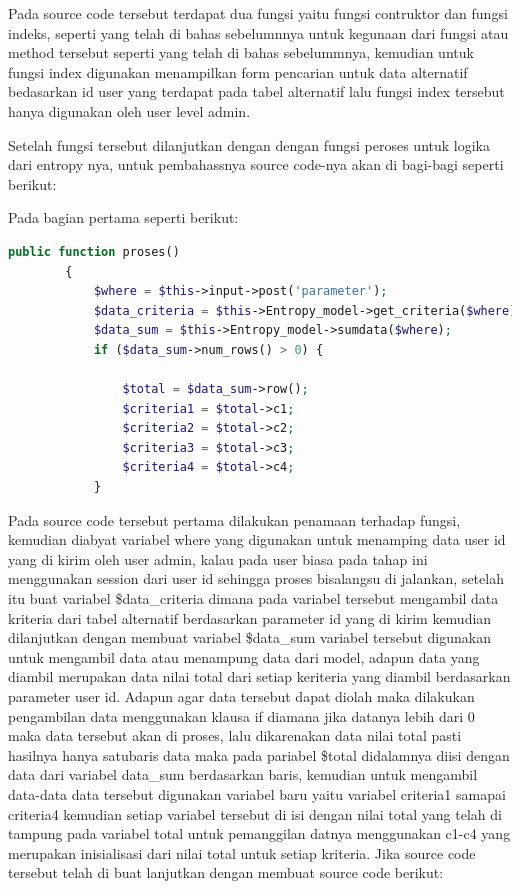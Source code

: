 Pada source code tersebut terdapat dua fungsi yaitu fungsi contruktor dan fungsi indeks, seperti yang telah di bahas sebelumnnya untuk kegunaan dari fungsi atau method tersebut seperti yang telah di bahas sebelummnya, kemudian untuk fungsi index digunakan menampilkan form pencarian untuk data alternatif bedasarkan id user yang terdapat pada tabel alternatif lalu fungsi index tersebut hanya digunakan oleh user level admin.\par
	Setelah fungsi tersebut dilanjutkan dengan dengan fungsi peroses untuk logika dari entropy nya, untuk pembahassnya source code-nya akan di bagi-bagi seperti berikut:\par
Pada bagian pertama seperti berikut:\par

\begin{lstlisting}[language=PHP]
	    public function proses()  
	    {  
	        $where = $this->input->post('parameter');  
	        $data_criteria = $this->Entropy_model->get_criteria($where);  
	        $data_sum = $this->Entropy_model->sumdata($where);  
	        if ($data_sum->num_rows() > 0) {  
	  
	            $total = $data_sum->row();  
	            $criteria1 = $total->c1;  
	            $criteria2 = $total->c2;  
	            $criteria3 = $total->c3;  
	            $criteria4 = $total->c4;  
	        } 
\end{lstlisting}

Pada source code tersebut pertama dilakukan penamaan terhadap fungsi, kemudian diabyat variabel where yang digunakan untuk menamping data user id yang di kirim oleh user admin, kalau pada user biasa pada tahap ini menggunakan session dari user id sehingga proses bisalangsu di jalankan, setelah itu buat variabel \$data\_criteria dimana pada variabel tersebut mengambil data kriteria dari tabel alternatif berdasarkan parameter id yang di kirim kemudian dilanjutkan dengan membuat variabel \$data\_sum variabel tersebut digunakan untuk mengambil data atau menampung data dari model, adapun data yang diambil merupakan data nilai total dari setiap keriteria yang diambil berdasarkan parameter user id.
Adapun agar data tersebut dapat diolah maka dilakukan pengambilan data menggunakan klausa if diamana jika datanya lebih dari 0 maka data tersebut akan di proses, lalu dikarenakan data nilai total pasti hasilnya hanya satubaris data maka pada pariabel \$total didalamnya diisi dengan data dari variabel data\_sum berdasarkan baris, kemudian untuk mengambil data-data data tersebut digunakan variabel baru yaitu variabel criteria1 samapai criteria4 kemudian setiap variabel tersebut di isi dengan nilai total yang telah di tampung pada variabel total untuk pemanggilan datnya menggunakan c1-c4 yang merupakan inisialisasi dari nilai total untuk setiap kriteria.
Jika source code tersebut telah di buat lanjutkan dengan membuat source code berikut:

